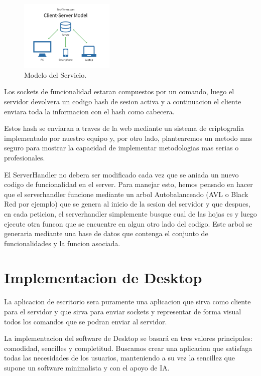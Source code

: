 \documentclass{article}
\theoremstyle{definition}
\begin{document}
\begin{figure}
\centering
\includegraphics[width=0.4\textwidth]{pics/serverclient.png}
\caption{Modelo del Servicio.}
\end{figure} 

Los sockets de funcionalidad estaran compuestos por un comando, luego el servidor devolvera un codigo hash de sesion activa y a continuacion el cliente enviara toda la informacion con el hash como cabecera.

Estos hash se enviaran a traves de la web mediante un sistema de criptografia implementado por nuestro equipo y, por otro lado, plantearemos un metodo mas seguro para mostrar la capacidad de implementar metodologias mas serias o profesionales.

El ServerHandler no debera ser modificado cada vez que se aniada un nuevo codigo de funcionalidad en el server. Para manejar esto, hemos pensado en hacer que el serverhandler funcione mediante un arbol Autobalanceado (AVL o Black Red por ejemplo) que se genera al inicio de la sesion del servidor y que despues, en cada peticion, el serverhandler simplemente busque cual de las hojas es y luego ejecute otra funcon que se encuentre en algun otro lado del codigo. Este arbol se generaria mediante una base de datos que contenga el conjunto de funcionalidades y la funcion asociada.



\section{Implementacion de Desktop}

La aplicacion de escritorio sera puramente una aplicacion que sirva como cliente para el servidor y que sirva para enviar sockets y representar de forma visual todos los comandos que se podran enviar al servidor.

La implementacion del software de Desktop se basará en tres valores principales: comodidad, sencilles y completitud. Buscamos crear una aplicacion que satisfaga todas las necesidades de los usuarios, manteniendo a su vez la sencillez que supone un software minimalista y con el apoyo de IA.
\end{document}
